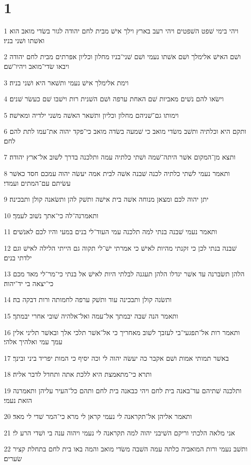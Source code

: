\chapter{1}

\par 1 ויהי בימי שׁפט השׁפטים ויהי רעב בארץ וילך אישׁ מבית לחם יהודה לגור בשׂדי מואב הוא ואשׁתו ושׁני בניו׃
\par 2 ושׁם האישׁ אלימלך ושׁם אשׁתו נעמי ושׁם שׁני־בניו מחלון וכליון אפרתים מבית לחם יהודה ויבאו שׂדי־מואב ויהיו־שׁם׃
\par 3 וימת אלימלך אישׁ נעמי ותשׁאר היא ושׁני בניה׃
\par 4 וישׂאו להם נשׁים מאביות שׁם האחת ערפה ושׁם השׁנית רות וישׁבו שׁם כעשׂר שׁנים׃
\par 5 וימותו גם־שׁניהם מחלון וכליון ותשׁאר האשׁה משׁני ילדיה ומאישׁה׃
\par 6 ותקם היא וכלתיה ותשׁב משׂדי מואב כי שׁמעה בשׂדה מואב כי־פקד יהוה את־עמו לתת להם לחם׃
\par 7 ותצא מן־המקום אשׁר היתה־שׁמה ושׁתי כלתיה עמה ותלכנה בדרך לשׁוב אל־ארץ יהודה׃
\par 8 ותאמר נעמי לשׁתי כלתיה לכנה שׁבנה אשׁה לבית אמה יעשׂה יהוה עמכם חסד כאשׁר עשׂיתם עם־המתים ועמדי׃
\par 9 יתן יהוה לכם ומצאן מנוחה אשׁה בית אישׁה ותשׁק להן ותשׂאנה קולן ותבכינה׃
\par 10 ותאמרנה־לה כי־אתך נשׁוב לעמך׃
\par 11 ותאמר נעמי שׁבנה בנתי למה תלכנה עמי העוד־לי בנים במעי והיו לכם לאנשׁים׃
\par 12 שׁבנה בנתי לכן כי זקנתי מהיות לאישׁ כי אמרתי ישׁ־לי תקוה גם הייתי הלילה לאישׁ וגם ילדתי בנים׃
\par 13 הלהן תשׂברנה עד אשׁר יגדלו הלהן תעגנה לבלתי היות לאישׁ אל בנתי כי־מר־לי מאד מכם כי־יצאה בי יד־יהוה׃
\par 14 ותשׂנה קולן ותבכינה עוד ותשׁק ערפה לחמותה ורות דבקה בה׃
\par 15 ותאמר הנה שׁבה יבמתך אל־עמה ואל־אלהיה שׁובי אחרי יבמתך׃
\par 16 ותאמר רות אל־תפגעי־בי לעזבך לשׁוב מאחריך כי אל־אשׁר תלכי אלך ובאשׁר תליני אלין עמך עמי ואלהיך אלהי׃
\par 17 באשׁר תמותי אמות ושׁם אקבר כה יעשׂה יהוה לי וכה יסיף כי המות יפריד ביני ובינך׃
\par 18 ותרא כי־מתאמצת היא ללכת אתה ותחדל לדבר אליה׃
\par 19 ותלכנה שׁתיהם עד־באנה בית לחם ויהי כבאנה בית לחם ותהם כל־העיר עליהן ותאמרנה הזאת נעמי׃
\par 20 ותאמר אליהן אל־תקראנה לי נעמי קראן לי מרא כי־המר שׁדי לי מאד׃
\par 21 אני מלאה הלכתי וריקם השׁיבני יהוה למה תקראנה לי נעמי ויהוה ענה בי ושׁדי הרע לי׃
\par 22 ותשׁב נעמי ורות המואביה כלתה עמה השׁבה משׂדי מואב והמה באו בית לחם בתחלת קציר שׂערים׃

